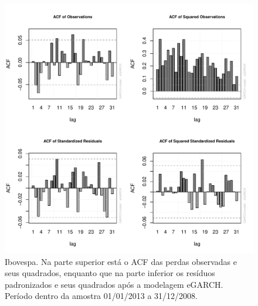 \documentclass[1p]{elsarticle}
\theoremstyle{definition}
\begin{document}
\begin{figure}[H]
	\centering
	\includegraphics[width=1\linewidth]{figs/artigo-acf-IBovespa}
	\caption{Ibovespa. Na parte superior está o ACF das perdas observadas e seus quadrados, enquanto que na parte inferior os resíduos padronizados e seus quadrados após a modelagem eGARCH. Período dentro da amostra 01/01/2013 a 31/12/2008.}
	\label{fig:artigo-acf-ibovespa}
\end{figure}
\end{document}
